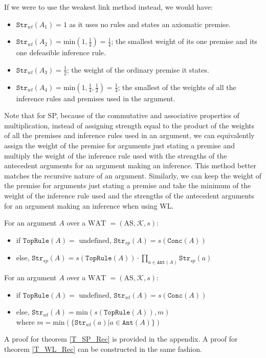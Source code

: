 \documentclass[runningheads]{llncs}
\newcommand{\K}{\mathcal{K}}
\newcommand{\Conc}{\texttt{Conc}}
\newcommand{\TopRule}{\texttt{TopRule}}
\newcommand{\Ant}{\texttt{Ant}}
\newcommand{\Str}{\texttt{Str}}
\begin{document}
\begin{example}
If we were to use the weakest link method instead, we would have:
\begin{itemize}
    \item $\Str_{wl}(A_1) = 1$ as it uses no rules and states an axiomatic premise.
    \item $\Str_{wl}(A_2) = \text{min}(1,\frac{1}{4}) = \frac{1}{4}$; the smallest weight of its one premise and its one defeasible inference rule.
    \item $\Str_{wl}(A_3) = \frac{1}{2}$; the weight of the ordinary premise it states.
    \item $\Str_{wl}(A_4) = \text{min}(1, \frac{1}{4}, \frac{1}{2}) = \frac{1}{4}$; the smallest of the weights of all the inference rules and premises used in the argument.
\end{itemize}
\end{example}

Note that for SP, because of the commutative and associative properties of multiplication, instead of assigning strength equal to the product of the weights of all the premises and inference rules used in an argument, we can equivalently assign the weight of the premise for arguments just stating a premise and multiply the weight of the inference rule used with the strengths of the antecedent arguments for an argument making an inference. This method better matches the recursive nature of an argument. Similarly, we can keep the weight of the premise for arguments just stating a premise and take the minimum of the weight of the inference rule used and the strengths of the antecedent arguments for an argument making an inference when using WL.

\begin{theorem}\label{T_SP_Rec}
For an argument $A$ over a $\text{WAT } = ( \text{AS}, \K, s )$:
\begin{itemize}
    \item if $\TopRule(A) = \text{ undefined}$, $\Str_{sp}(A) = s(\Conc(A))$
    \item else, $\Str_{sp}(A) = s(\TopRule(A)) \cdot \prod_{a \in \Ant(A)}\Str_{sp}(a)$
\end{itemize}
\end{theorem}

\begin{theorem}\label{T_WL_Rec}
For an argument $A$ over a $\text{WAT } = ( \text{AS}, \K, s )$:
\begin{itemize}
    \item if $\TopRule(A) = \text{ undefined}$, $\Str_{wl}(A) = s(\Conc(A))$
    \item else, $\Str_{wl}(A) = \text{min}(s(\TopRule(A)), m)$ \\where $m = \text{min}(\{\Str_{wl}(a)|a \in \Ant(A)\})$
\end{itemize}
\end{theorem}
\begin{note}
    A proof for theorem \ref{T_SP_Rec} is provided in the appendix. A proof for theorem \ref{T_WL_Rec} can be constructed in the same fashion.
\end{note}
\end{document}
